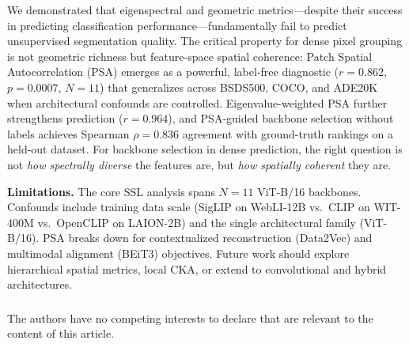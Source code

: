 \documentclass[runningheads]{llncs}
\begin{document}
We demonstrated that eigenspectral and geometric metrics---despite their success in predicting classification performance---fundamentally fail to predict unsupervised segmentation quality. The critical property for dense pixel grouping is not geometric richness but feature-space spatial coherence: Patch Spatial Autocorrelation (PSA) emerges as a powerful, label-free diagnostic ($r=0.862$, $p=0.0007$, $N=11$) that generalizes across BSDS500, COCO, and ADE20K when architectural confounds are controlled. Eigenvalue-weighted PSA further strengthens prediction ($r=0.964$), and PSA-guided backbone selection without labels achieves Spearman $\rho=0.836$ agreement with ground-truth rankings on a held-out dataset. For backbone selection in dense prediction, the right question is not \emph{how spectrally diverse} the features are, but \emph{how spatially coherent} they are.

\textbf{Limitations.} The core SSL analysis spans $N=11$ ViT-B/16 backbones. Confounds include training data scale (SigLIP on WebLI-12B vs.\ CLIP on WIT-400M vs.\ OpenCLIP on LAION-2B) and the single architectural family (ViT-B/16). PSA breaks down for contextualized reconstruction (Data2Vec) and multimodal alignment (BEiT3) objectives. Future work should explore hierarchical spatial metrics, local CKA, or extend to convolutional and hybrid architectures.

\begin{credits}
\vspace{-10pt}
\subsubsection{\discintname}
The authors have no competing interests to declare that are relevant to the content of this article.
\end{credits}
\end{document}
